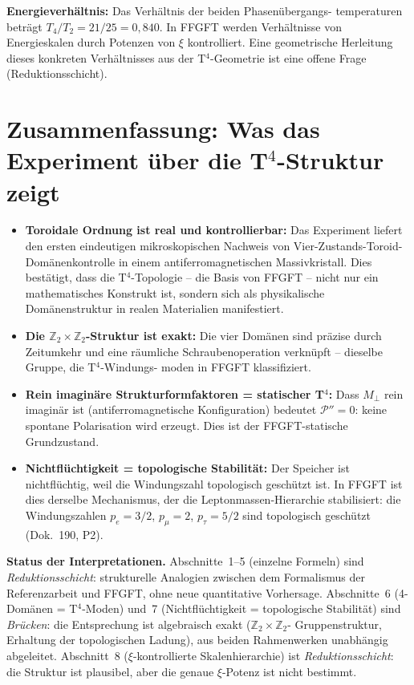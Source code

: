\noindent\textbf{Energieverhältnis:} Das Verhältnis der beiden Phasenübergangs-
temperaturen beträgt $T_4/T_2 = 21/25 = 0{,}840$. In FFGFT werden Verhältnisse
von Energieskalen durch Potenzen von $\xi$ kontrolliert. Eine geometrische
Herleitung dieses konkreten Verhältnisses aus der T$^4$-Geometrie ist eine
offene Frage (Reduktionsschicht).

\section{Zusammenfassung: Was das Experiment über die T$^4$-Struktur zeigt}

\begin{itemize}
  \item \textbf{Toroidale Ordnung ist real und kontrollierbar:} Das Experiment
        liefert den ersten eindeutigen mikroskopischen Nachweis von
        Vier-Zustands-Toroid-Domänenkontrolle in einem antiferromagnetischen
        Massivkristall. Dies bestätigt, dass die T$^4$-Topologie -- die Basis
        von FFGFT -- nicht nur ein mathematisches Konstrukt ist, sondern sich
        als physikalische Domänenstruktur in realen Materialien manifestiert.
  \item \textbf{Die $\mathbb{Z}_2\times\mathbb{Z}_2$-Struktur ist exakt:}
        Die vier Domänen sind präzise durch Zeitumkehr und eine räumliche
        Schraubenoperation verknüpft -- dieselbe Gruppe, die T$^4$-Windungs-
        moden in FFGFT klassifiziert.
  \item \textbf{Rein imaginäre Strukturformfaktoren = statischer T$^4$:}
        Dass $M_\perp$ rein imaginär ist (antiferromagnetische Konfiguration)
        bedeutet $\mathcal{P}''=0$: keine spontane Polarisation wird erzeugt.
        Dies ist der FFGFT-statische Grundzustand.
  \item \textbf{Nichtflüchtigkeit = topologische Stabilität:} Der Speicher
        ist nichtflüchtig, weil die Windungszahl topologisch geschützt ist.
        In FFGFT ist dies derselbe Mechanismus, der die Leptonmassen-Hierarchie
        stabilisiert: die Windungszahlen $p_e=3/2$, $p_\mu=2$, $p_\tau=5/2$
        sind topologisch geschützt (Dok.~190, P2).
\end{itemize}

\noindent\textbf{Status der Interpretationen.}
Abschnitte~1--5 (einzelne Formeln) sind \emph{Reduktionsschicht}: strukturelle
Analogien zwischen dem Formalismus der Referenzarbeit und FFGFT, ohne neue
quantitative Vorhersage. Abschnitte~6 (4-Domänen = T$^4$-Moden) und~7
(Nichtflüchtigkeit = topologische Stabilität) sind \emph{Brücken}: die
Entsprechung ist algebraisch exakt ($\mathbb{Z}_2\times\mathbb{Z}_2$-
Gruppenstruktur, Erhaltung der topologischen Ladung), aus beiden Rahmenwerken
unabhängig abgeleitet. Abschnitt~8 ($\xi$-kontrollierte Skalenhierarchie)
ist \emph{Reduktionsschicht}: die Struktur ist plausibel, aber die genaue
$\xi$-Potenz ist nicht bestimmt.

